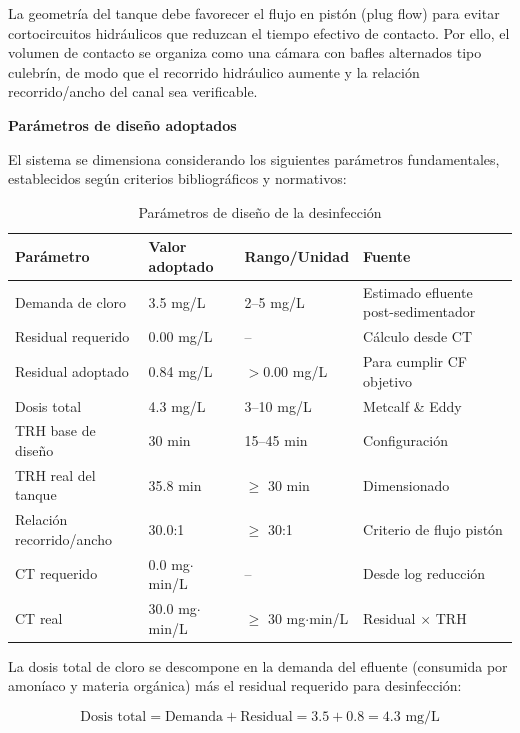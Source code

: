 \documentclass[12pt,a4paper]{article}
\begin{document}
La geometría del tanque debe favorecer el flujo en pistón (plug flow) para evitar cortocircuitos hidráulicos que reduzcan el tiempo efectivo de contacto. Por ello, el volumen de contacto se organiza como una cámara con bafles alternados tipo culebrín, de modo que el recorrido hidráulico aumente y la relación recorrido/ancho del canal sea verificable.

\textbf{Parámetros de diseño adoptados}

El sistema se dimensiona considerando los siguientes parámetros fundamentales, establecidos según criterios bibliográficos y normativos:

\begin{table}[H]
\centering
\caption{Parámetros de diseño de la desinfección}
\small
\begin{tabular}{@{}p{}p{}p{}p{}@{}}
\toprule
\textbf{Parámetro} & \textbf{Valor adoptado} & \textbf{Rango/Unidad} & \textbf{Fuente} \\
\midrule
Demanda de cloro & 3.5 mg/L & 2--5 mg/L & Estimado efluente post-sedimentador \\
Residual requerido & 0.00 mg/L & -- & Cálculo desde CT \\
Residual adoptado & 0.84 mg/L & $>$0.00 mg/L & Para cumplir CF objetivo \\
Dosis total & 4.3 mg/L & 3--10 mg/L & Metcalf \& Eddy \cite{metcalf2014} \\
TRH base de diseño & 30 min & 15--45 min & Configuración \\
TRH real del tanque & 35.8 min & $\geq$ 30 min & Dimensionado \\
Relación recorrido/ancho & 30.0:1 & $\geq$ 30:1 & Criterio de flujo pistón \\
CT requerido & 0.0 mg$\cdot$min/L & -- & Desde log reducción \\
CT real & 30.0 mg$\cdot$min/L & $\geq$ 30 mg$\cdot$min/L & Residual $\times$ TRH \\
\bottomrule
\end{tabular}
\end{table}

La dosis total de cloro se descompone en la demanda del efluente (consumida por amoníaco y materia orgánica) más el residual requerido para desinfección:

\begin{equation}
\text{Dosis total} = \text{Demanda} + \text{Residual} = 3.5 + 0.8 = 4.3 \text{ mg/L}
\end{equation}
\end{document}
